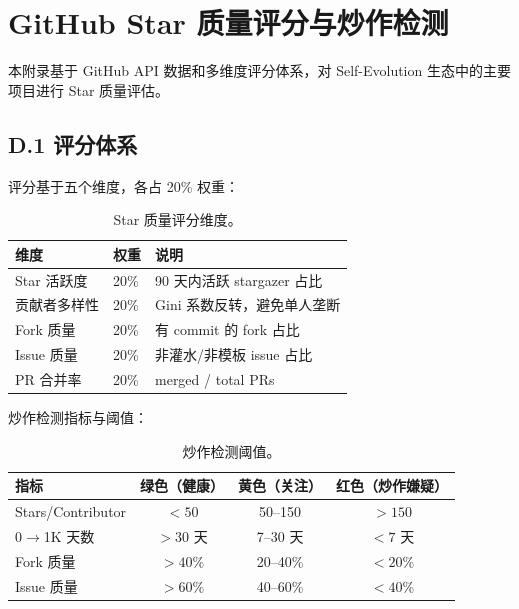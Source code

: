 \section{GitHub Star 质量评分与炒作检测}\label{app:star-quality}

本附录基于 GitHub API 数据和多维度评分体系，对 Self-Evolution 生态中的主要项目进行 Star 质量评估。

\subsection*{D.1 评分体系}

评分基于五个维度，各占 20\% 权重：

\begin{table}[htbp]
\centering
\small
\caption{Star 质量评分维度。}
\begin{tabular}{p{2.5cm}p{2cm}p{5cm}}
\toprule
\textbf{维度} & \textbf{权重} & \textbf{说明} \\
\midrule
Star 活跃度 & 20\% & 90 天内活跃 stargazer 占比 \\
贡献者多样性 & 20\% & Gini 系数反转，避免单人垄断 \\
Fork 质量 & 20\% & 有 commit 的 fork 占比 \\
Issue 质量 & 20\% & 非灌水/非模板 issue 占比 \\
PR 合并率 & 20\% & merged / total PRs \\
\bottomrule
\end{tabular}
\end{table}

炒作检测指标与阈值：

\begin{table}[htbp]
\centering
\small
\caption{炒作检测阈值。}
\begin{tabular}{lccc}
\toprule
\textbf{指标} & \textbf{绿色（健康）} & \textbf{黄色（关注）} & \textbf{红色（炒作嫌疑）} \\
\midrule
Stars/Contributor & $< 50$ & 50--150 & $> 150$ \\
0$\to$1K 天数 & $> 30$ 天 & 7--30 天 & $< 7$ 天 \\
Fork 质量 & $> 40\%$ & 20--40\% & $< 20\%$ \\
Issue 质量 & $> 60\%$ & 40--60\% & $< 40\%$ \\
\bottomrule
\end{tabular}
\end{table}

